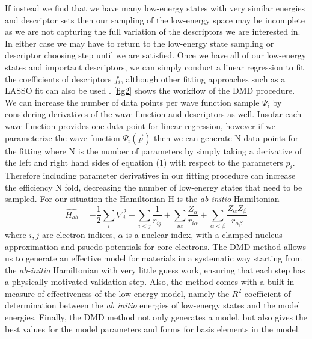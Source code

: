 \documentclass{article}
\begin{document}
If instead we find that we have many low-energy states with very similar energies and descriptor sets then our sampling of the low-energy space may be incomplete as we are not capturing the full variation of the descriptors we are interested in. 
In either case we may have to return to the low-energy state sampling or descriptor choosing step until we are satisfied. Once we have all of our low-energy states and important descriptors, we can simply conduct a linear regression to fit the coefficients of descriptors $f_i$, although other fitting approaches such as a LASSO fit can also be used \cite{10.2307/2346178}.
\ref{fig2} shows the workflow of the DMD procedure. 
We can increase the number of data points per wave function sample $\Psi_i$ by considering derivatives of the wave function and descriptors as well. 
Insofar each wave function provides one data point for linear regression, however if we parameterize the wave function $\Psi_i(\vec{p})$ then we can generate N data points for the fitting where N is the number of parameters by simply taking a derivative of the left and right hand sides of equation (1) with respect to the parameters $p_i$. 
Therefore including parameter derivatives in our fitting procedure can increase the efficiency N fold, decreasing the number of low-energy states that need to be sampled. 
For our situation the Hamiltonian H is the \textit{ab initio} Hamiltonian 
\begin{equation}
\hat{H_{ab}} = -\frac{1}{2} \sum_i \nabla_i^2 + \sum_{i<j} \frac{1}{r_{ij}} + \sum_{i\alpha} \frac{Z_\alpha}{r_{i\alpha}} + \sum_{\alpha<\beta} \frac{Z_{\alpha}Z_{\beta}}{r_{\alpha \beta}}
\end{equation}
where $i,j$ are electron indices, $\alpha$ is a nuclear index, with a clamped nucleus approximation and psuedo-potentials for core electrons.  
The DMD method allows us to generate an effective model for materials in a systematic way starting from the \textit{ab-initio} Hamiltonian with very little guess work, ensuring that each step has a physically motivated validation step. 
Also, the method comes with a built in measure of effectiveness of the low-energy model, namely the $R^2$ coefficient of determination between the \textit{ab initio} energies of low-energy states and the model energies.
Finally, the DMD method not only generates a model, but also gives the best values for the model parameters and forms for basis elements in the model.
\end{document}
